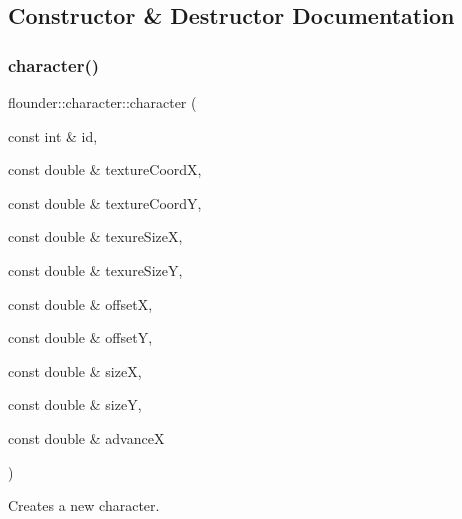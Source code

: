 \subsection{Constructor \& Destructor Documentation}
\mbox{\label{classflounder_1_1character_ae258dfe0dc5ac451346ceca6b0ff6647}} 
\subsubsection{\texorpdfstring{character()}{character()}}
{\footnotesize\ttfamily flounder\+::character\+::character (\begin{DoxyParamCaption}\item[{const int \&}]{id,  }\item[{const double \&}]{texture\+CoordX,  }\item[{const double \&}]{texture\+CoordY,  }\item[{const double \&}]{texure\+SizeX,  }\item[{const double \&}]{texure\+SizeY,  }\item[{const double \&}]{offsetX,  }\item[{const double \&}]{offsetY,  }\item[{const double \&}]{sizeX,  }\item[{const double \&}]{sizeY,  }\item[{const double \&}]{advanceX }\end{DoxyParamCaption})}



Creates a new character. 


